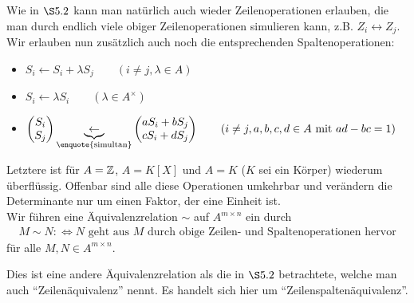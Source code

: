 \documentclass[../../main.tex]{subfiles}
\begin{document}
Wie in $\S5.2$ kann man natürlich auch wieder Zeilenoperationen erlauben, die man durch endlich viele obiger Zeilenoperationen simulieren kann, z.B. $Z_i\longleftrightarrow Z_j$. Wir erlauben nun zusätzlich auch noch die entsprechenden Spaltenoperationen:
\begin{itemize}
    \item
        $S_i\leftarrow S_i+\lambda S_j \qquad (i\neq j, \lambda\in A)$
    \item
        $S_i\leftarrow \lambda S_i\qquad(\lambda\in A^\times)$
    \item
        $\begin{pmatrix*}
            S_i\\ S_j
        \end{pmatrix*}
        \underbrace{\leftarrow}_\text{\enquote{simultan}} 
        \begin{pmatrix*}
            aS_i+bS_j\\ cS_i+dS_j
        \end{pmatrix*}
        \qquad (i\neq j, a,b,c,d\in A\text{ mit }ad-bc=1)$
\end{itemize}
Letztere ist für $A=\mathbb Z$, $A=K[X]$ und $A=K$ ($K$ sei ein Körper) wiederum überflüssig. Offenbar sind alle diese Operationen umkehrbar und verändern die Determinante nur um einen Faktor, der eine Einheit ist.\\
Wir führen eine Äquivalenzrelation $\sim$ auf $A^{m\times n}$ ein durch
\begin{align*}
    M\sim N:\Longleftrightarrow N \text{ geht aus }M\text{ durch obige Zeilen- und Spaltenoperationen hervor}
\end{align*}
für alle $M,N\in A^{m\times n}$.

\begin{warning}\label{17.1.1}
    Dies ist eine andere Äquivalenzrelation als die in $\S5.2$ betrachtete, welche man auch \enquote{Zeilenäquivalenz} nennt. Es handelt sich hier um \enquote{Zeilenspaltenäquivalenz}.
\end{warning}
\end{document}
